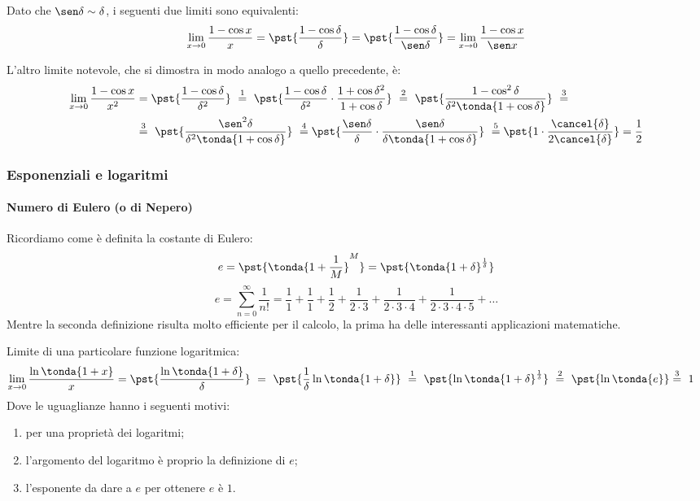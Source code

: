 \begin{osservazione}
Dato che \(\sen \delta \sim \delta\), i seguenti due limiti sono 
equivalenti:
\[\lim_{x \rightarrow 0} \frac{1-\cos x}{x} =
 \pst{\frac{1-\cos \delta}{\delta}} =
 \pst{\frac{1-\cos \delta}{\sen \delta}} =
 \lim_{x \rightarrow 0} \frac{1-\cos x}{\sen x}\]
\end{osservazione}

L'altro limite notevole, che si dimostra in modo analogo a quello 
precedente, è:
\begin{align*}
 \lim_{x \rightarrow 0} \frac{1-\cos x}{x^2} &=
 \pst{\frac{1-\cos \delta}{\delta^2}}
~ \stackrel{1}{=} ~  
 \pst{\frac{1-\cos \delta}{\delta^2} \cdot 
      \frac{1+\cos \delta^2}{1+\cos \delta}}
~ \stackrel{2}{=} ~ 
 \pst{\frac{1-\cos^2 \delta}{\delta^2 \tonda{1+\cos \delta}}}~ 
\stackrel{3}{=} \\
& \stackrel{3}{=} ~
 \pst{\frac{\sen^2 \delta}{\delta^2 \tonda{1+\cos \delta}}}
~ \stackrel{4}{=}
 \pst{\frac{\sen \delta}{\delta} \cdot 
      \frac{\sen \delta}{\delta \tonda{1+\cos \delta}}}
~ \stackrel{5}{=}
 \pst{1 \cdot \frac{\cancel{\delta}}{2 \cancel{\delta}}} = \frac{1}{2}
\end{align*}

\subsubsection{Esponenziali e logaritmi}

\paragraph{Numero di Eulero (o di Nepero)}

Ricordiamo come è definita la costante di Eulero:
\[e = \pst{\tonda{1+\frac{1}{M}}^M} = 
\pst{\tonda{1+\delta}^\frac{1}{\delta}} 
\]
\[e=\sum_{n=0}^{\infty}{\frac{1}{n!}}=
\frac{1}{1}+\frac{1}{1}+\frac{1}{2}+\frac{1}{2\cdot3}+
\frac{1}{2\cdot3\cdot4}+\frac{1}{2\cdot3\cdot4\cdot5}+\dots\]
Mentre la seconda definizione risulta molto efficiente per il calcolo, la 
prima ha delle interessanti applicazioni matematiche.

\begin{esempio}
\label{esempio:log}
Limite di una particolare funzione logaritmica:
\begin{align*}
 \lim_{x \rightarrow 0} \dfrac{\ln\tonda{1+x}}{x} &=
 \pst{\dfrac{\ln\tonda{1+\delta}}{\delta}}~ = ~  
 \pst{\frac{1}{\delta}\ln\tonda{1+\delta}} ~\stackrel{1}{=} ~
 \pst{\ln\tonda{1+\delta}^\frac{1}{\delta}}
~ \stackrel{2}{=} ~
\pst{\ln\tonda{e}} \stackrel{3}{=} ~ 1
\end{align*}
Dove le uguaglianze hanno i seguenti motivi:
\begin{enumerate} [nosep]
 \item per una proprietà dei logaritmi;
 \item l'argomento del logaritmo è proprio la definizione di \(e\);
 \item l'esponente da dare a \(e\) per ottenere \(e\) è \(1\).
\end{enumerate}
\end{esempio}


